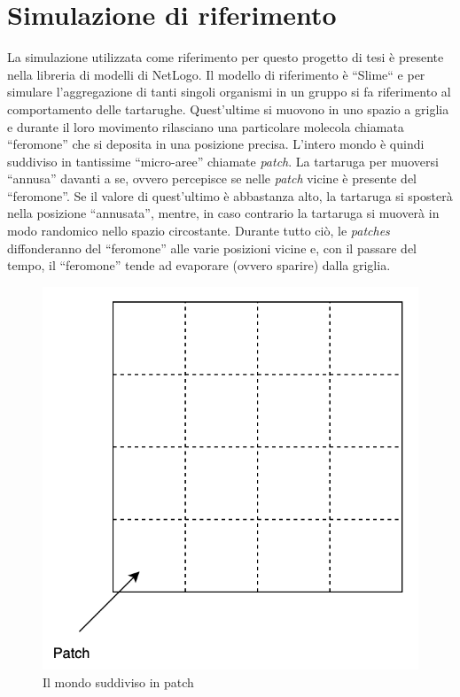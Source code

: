 \documentclass[12pt,a4paper,openright,twoside]{book}
\begin{document}
\section{Simulazione di riferimento}\label{refSim}
La simulazione utilizzata come riferimento per questo progetto di tesi è presente nella libreria
di modelli di NetLogo\space\cite{wilensky1997netlogo}. Il modello di riferimento è ``Slime``\space\cite{wilensky1997netlogo}
e per simulare l'aggregazione di tanti singoli organismi in un gruppo si fa riferimento al comportamento delle tartarughe.
Quest'ultime si muovono in uno spazio a griglia e durante il loro movimento rilasciano una particolare molecola
chiamata ``feromone'' che si deposita in una posizione precisa. L'intero mondo è quindi suddiviso
in tantissime ``micro-aree'' chiamate \textit{patch}. La tartaruga per muoversi 
``annusa'' davanti a se, ovvero percepisce se nelle \textit{patch} vicine è presente del ``feromone''. Se il valore di quest'ultimo è abbastanza alto, la 
tartaruga si sposterà nella posizione ``annusata'', mentre, in caso contrario la tartaruga si muoverà in modo randomico nello spazio circostante. 
Durante tutto ciò, le \textit{patches} diffonderanno del ``feromone'' alle varie posizioni vicine e, con il passare del tempo,
il ``feromone'' tende ad evaporare (ovvero sparire) dalla griglia.
\begin{figure}[ht]
    \centering
    \includegraphics[width=.6\linewidth]{figures/patch.png}
    \caption{Il mondo suddiviso in patch}\label{fig:patch}
\end{figure}
\clearpage
\end{document}
